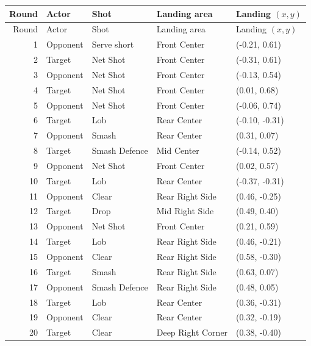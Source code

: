 \begin{longtable}{rlllp{2.1cm}}
\toprule
Round & Actor & Shot & Landing area & Landing $(x,y)$ \\
\midrule
\endfirsthead
\toprule
Round & Actor & Shot & Landing area & Landing $(x,y)$ \\
\midrule
\endhead
1 & Opponent & Serve short & Front Center & (-0.21, 0.61) \\
2 & Target & Net Shot & Front Center & (-0.31, 0.61) \\
3 & Opponent & Net Shot & Front Center & (-0.13, 0.54) \\
4 & Target & Net Shot & Front Center & (0.01, 0.68) \\
5 & Opponent & Net Shot & Front Center & (-0.06, 0.74) \\
6 & Target & Lob & Rear Center & (-0.10, -0.31) \\
7 & Opponent & Smash & Rear Center & (0.31, 0.07) \\
8 & Target & Smash Defence & Mid Center & (-0.14, 0.52) \\
9 & Opponent & Net Shot & Front Center & (0.02, 0.57) \\
10 & Target & Lob & Rear Center & (-0.37, -0.31) \\
11 & Opponent & Clear & Rear Right Side & (0.46, -0.25) \\
12 & Target & Drop & Mid Right Side & (0.49, 0.40) \\
13 & Opponent & Net Shot & Front Center & (0.21, 0.59) \\
14 & Target & Lob & Rear Right Side & (0.46, -0.21) \\
15 & Opponent & Clear & Rear Right Side & (0.58, -0.30) \\
16 & Target & Smash & Rear Right Side & (0.63, 0.07) \\
17 & Opponent & Smash Defence & Rear Right Side & (0.48, 0.05) \\
18 & Target & Lob & Rear Center & (0.36, -0.31) \\
19 & Opponent & Clear & Rear Center & (0.32, -0.19) \\
20 & Target & Clear & Deep Right Corner & (0.38, -0.40) \\
\bottomrule
\end{longtable}


